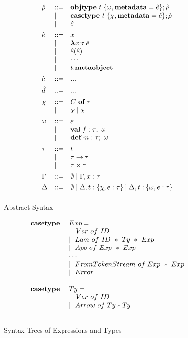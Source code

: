 \begin{figure}
\[\begin{array}[t]{lll}
\hat\rho & \bnfdef & \keyw{objtype}~ t~ \{ \omega, \keyw{metadata}=\hat e \}; \hat\rho \\
     & \bnfalt & \keyw{casetype}~ t~ \{ \chi, \keyw{metadata}=\hat e \}; \hat\rho\\
     & \bnfalt & \hat e
     \\[1ex]
\hat{e}    & \bnfdef & x \\
     & \bnfalt & \boldsymbol\lambda x{:}\tau . \hat{e} \\ %
     & \bnfalt & \hat{e}(\hat{e}) \\
     & \bnfalt & \cdots \\
     & \bnfalt & t.\keyw{metaobject} 
\\[1ex]
\hat c    & \bnfdef & ...
	 \\[1ex]
\hat d   & \bnfdef & ... 
\\[1ex] 
\chi & \bnfdef & C~\keyw{of}~\tau\\
     & \bnfalt & \chi \bnfalt \chi 
\\[1ex]
\omega &\bnfdef & \varepsilon \\  
         & \bnfalt & \keyw{val}~ f:\tau;~\omega\\
         & \bnfalt & \keyw{def}~ m:\tau;~\omega 
\\[1ex]
\tau & \bnfdef & t\\
     & \bnfalt & \tau \rightarrow \tau \\
     & \bnfalt & \tau \times \tau 
\\[1ex]
\Gamma & \bnfdef & \emptyset \bnfalt \Gamma, x:\tau
\\[1ex]
\Delta & \bnfdef & \emptyset \bnfalt \Delta, t:\{\chi, e:\tau\} \bnfalt \Delta, t:\{\omega, e:\tau\}
\\[1ex]

\end{array}
\]
\caption{Abstract Syntax}
\label{fig:core2-syntax}
\end{figure}


\begin{figure}
\centering
\[
\begin{array}{ll}
\textbf{casetype}\ & Exp=\\
& \ \ \ Var\ of\ ID\\
& \mathrel{\mid} \ Lam\ of\ ID\ *\ Ty\ *\ Exp\\
& \mathrel{\mid} \ App\ of\ Exp\ *\ Exp\\
& \cdots\\
& \mathrel{\mid} \ FromTokenStream\ of\ Exp\ *\ Exp\\
& \mathrel{\mid} \ Error\\
\\
\textbf{casetype}\ & Ty=\\
& \ \ \ Var\ of\ ID\\
& \mathrel{\mid} \ Arrow\ of\ Ty*Ty\\
\\ 
\end{array}
\]
\caption{Syntax Trees of Expressions and Types}
\end{figure}





